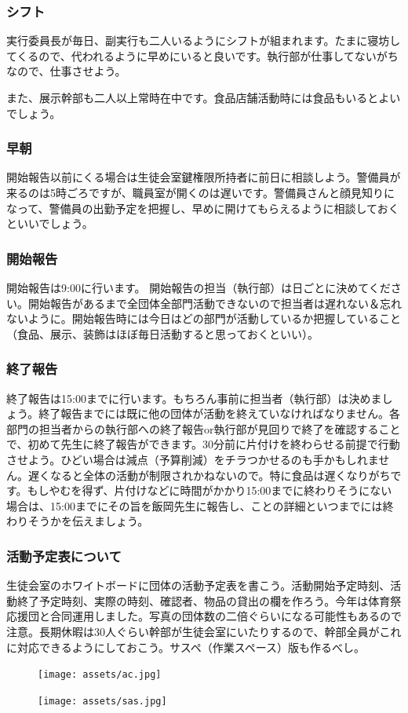 \documentclass[dvipdfmx,jb5]{jarticle}
\begin{document}
\subsubsection{シフト}
実行委員長が毎日、副実行も二人いるようにシフトが組まれます。たまに寝坊してくるので、代われるように早めにいると良いです。執行部が仕事してないがちなので、仕事させよう。

また、展示幹部も二人以上常時在中です。食品店舗活動時には食品もいるとよいでしょう。

\subsubsection{早朝}
開始報告以前にくる場合は生徒会室鍵権限所持者に前日に相談しよう。警備員が来るのは5時ごろですが、職員室が開くのは遅いです。警備員さんと顔見知りになって、警備員の出勤予定を把握し、早めに開けてもらえるように相談しておくといいでしょう。

\subsubsection{開始報告}
開始報告は9:00に行います。
開始報告の担当（執行部）は日ごとに決めてください。開始報告があるまで全団体全部門活動できないので担当者は遅れない＆忘れないように。開始報告時には今日はどの部門が活動しているか把握していること（食品、展示、装飾はほぼ毎日活動すると思っておくといい）。

\subsubsection{終了報告}
終了報告は15:00までに行います。もちろん事前に担当者（執行部）は決めましょう。終了報告までには既に他の団体が活動を終えていなければなりません。各部門の担当者からの執行部への終了報告or執行部が見回りで終了を確認することで、初めて先生に終了報告ができます。30分前に片付けを終わらせる前提で行動させよう。ひどい場合は減点（予算削減）をチラつかせるのも手かもしれません。遅くなると全体の活動が制限されかねないので。特に食品は遅くなりがちです。もしやむを得ず、片付けなどに時間がかかり15:00までに終わりそうにない場合は、15:00までにその旨を飯岡先生に報告し、ことの詳細といつまでには終わりそうかを伝えましょう。

\subsubsection{活動予定表について}
生徒会室のホワイトボードに団体の活動予定表を書こう。活動開始予定時刻、活動終了予定時刻、実際の時刻、確認者、物品の貸出の欄を作ろう。今年は体育祭応援団と合同運用しました。写真の団体数の二倍ぐらいになる可能性もあるので注意。長期休暇は30人ぐらい幹部が生徒会室にいたりするので、幹部全員がこれに対応できるようにしておこう。サスペ（作業スペース）版も作るべし。
\begin{figure}[h]
\begin{center}
  \texttt{[image: assets/ac.jpg]}
\end{center}
\end{figure}
\begin{figure}[h]
\begin{center}
\texttt{[image: assets/sas.jpg]}
\end{center}
\end{figure}
\end{document}
